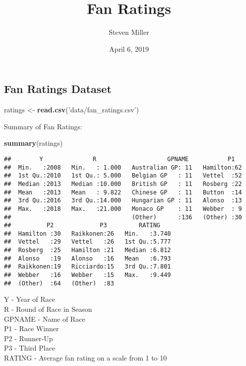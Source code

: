 \documentclass[]{article}
\title{Fan Ratings}
\author{Steven Miller}
\date{April 6, 2019}
\newenvironment{Shaded}{\begin{snugshade}}{\end{snugshade}}
\newcommand{\KeywordTok}[1]{\textcolor[rgb]{0.13,0.29,0.53}{\textbf{#1}}}
\newcommand{\StringTok}[1]{\textcolor[rgb]{0.31,0.60,0.02}{#1}}
\newcommand{\NormalTok}[1]{#1}
\begin{document}
\maketitle

\subsection{Fan Ratings Dataset}\label{fan-ratings-dataset}

\begin{Shaded}
\begin{Highlighting}[]
\NormalTok{ratings <-}\StringTok{ }\KeywordTok{read.csv}\NormalTok{(}\StringTok{'data/fan_ratings.csv'}\NormalTok{)}
\end{Highlighting}
\end{Shaded}

Summary of Fan Ratings:

\begin{Shaded}
\begin{Highlighting}[]
\KeywordTok{summary}\NormalTok{(ratings)}
\end{Highlighting}
\end{Shaded}

\begin{verbatim}
##        Y              R                    GPNAME           P1    
##  Min.   :2008   Min.   : 1.000   Australian GP: 11   Hamilton:62  
##  1st Qu.:2010   1st Qu.: 5.000   Belgian GP   : 11   Vettel  :52  
##  Median :2013   Median :10.000   British GP   : 11   Rosberg :22  
##  Mean   :2013   Mean   : 9.822   Chinese GP   : 11   Button  :14  
##  3rd Qu.:2016   3rd Qu.:14.000   Hungarian GP : 11   Alonso  :13  
##  Max.   :2018   Max.   :21.000   Monaco GP    : 11   Webber  : 9  
##                                  (Other)      :136   (Other) :30  
##          P2             P3         RATING     
##  Hamilton :30   Raikkonen:26   Min.   :3.740  
##  Vettel   :29   Vettel   :26   1st Qu.:5.777  
##  Rosberg  :25   Hamilton :21   Median :6.812  
##  Alonso   :19   Alonso   :16   Mean   :6.793  
##  Raikkonen:19   Ricciardo:15   3rd Qu.:7.801  
##  Webber   :16   Webber   :15   Max.   :9.449  
##  (Other)  :64   (Other)  :83
\end{verbatim}

Y - Year of Race\\
R - Round of Race in Season\\
GPNAME - Name of Race\\
P1 - Race Winner\\
P2 - Runner-Up\\
P3 - Third Place\\
RATING - Average fan rating on a scale from 1 to 10
\end{document}
